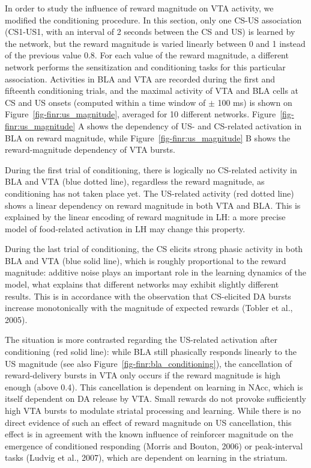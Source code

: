 \documentclass[
  11pt,
  a4paper,
]{scrbook}
\begin{document}
In order to study the influence of reward magnitude on VTA activity, we
modified the conditioning procedure. In this section, only one CS-US
association (CS1-US1, with an interval of 2 seconds between the CS and
US) is learned by the network, but the reward magnitude is varied
linearly between 0 and 1 instead of the previous value 0.8. For each
value of the reward magnitude, a different network performs the
sensitization and conditioning tasks for this particular association.
Activities in BLA and VTA are recorded during the first and fifteenth
conditioning trials, and the maximal activity of VTA and BLA cells at CS
and US onsets (computed within a time window of \(\pm\) 100 ms) is shown
on Figure~\ref{fig-finr:us_magnitude}, averaged for 10 different
networks. Figure~\ref{fig-finr:us_magnitude} A shows the dependency of
US- and CS-related activation in BLA on reward magnitude, while
Figure~\ref{fig-finr:us_magnitude} B shows the reward-magnitude
dependency of VTA bursts.

During the first trial of conditioning, there is logically no CS-related
activity in BLA and VTA (blue dotted line), regardless the reward
magnitude, as conditioning has not taken place yet. The US-related
activity (red dotted line) shows a linear dependency on reward magnitude
in both VTA and BLA. This is explained by the linear encoding of reward
magnitude in LH: a more precise model of food-related activation in LH
may change this property.

During the last trial of conditioning, the CS elicits strong phasic
activity in both BLA and VTA (blue solid line), which is roughly
proportional to the reward magnitude: additive noise plays an important
role in the learning dynamics of the model, what explains that different
networks may exhibit slightly different results. This is in accordance
with the observation that CS-elicited DA bursts increase monotonically
with the magnitude of expected rewards (Tobler et al., 2005).

The situation is more contrasted regarding the US-related activation
after conditioning (red solid line): while BLA still phasically responds
linearly to the US magnitude (see also
Figure~\ref{fig-finr:bla_conditioning}), the cancellation of
reward-delivery bursts in VTA only occurs if the reward magnitude is
high enough (above 0.4). This cancellation is dependent on learning in
NAcc, which is itself dependent on DA release by VTA. Small rewards do
not provoke sufficiently high VTA bursts to modulate striatal processing
and learning. While there is no direct evidence of such an effect of
reward magnitude on US cancellation, this effect is in agreement with
the known influence of reinforcer magnitude on the emergence of
conditioned responding (Morris and Bouton, 2006) or peak-interval tasks
(Ludvig et al., 2007), which are dependent on learning in the striatum.
\end{document}
